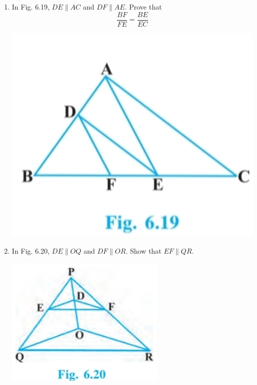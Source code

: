 \documentclass[a4paper,12pt]{article}
\begin{document}
\begin{enumerate}
\item 
\vspace{-5em}\begin{minipage}[t]{0.6\textwidth}
In Fig. 6.19, $DE \parallel AC$ and $DF \parallel AE$. Prove that  
$$
\frac{BF}{FE} = \frac{BE}{EC}
$$
\end{minipage}%
\hfill
\begin{minipage}[t]{0.35\textwidth}
\includegraphics[width=\linewidth]{a3.jpg}
\end{minipage}

\vspace{1em}

\item 
\vspace{10em}\begin{minipage}[t]{0.6\textwidth}
In Fig. 6.20, $DE \parallel OQ$ and $DF \parallel OR$. Show that $EF \parallel QR$.
\end{minipage}%
\hfill
\begin{minipage}[t]{0.35\textwidth}
\includegraphics[width=\linewidth]{a4.jpg}
\end{minipage}


\end{enumerate}
\end{document}
